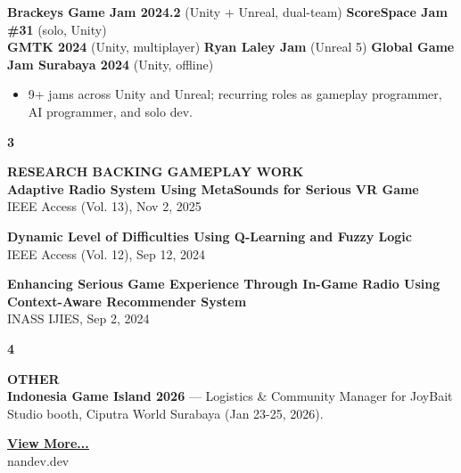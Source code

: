 \documentclass[11pt,a4paper]{article}
\begin{document}
\begin{minipage}[t]{18cm}
\begin{minipage}[t]{17cm}
\textbf{Brackeys Game Jam 2024.2} (Unity + Unreal, dual-team) \textbar{} \textbf{ScoreSpace Jam \#31} (solo, Unity)\\
\textbf{GMTK 2024} (Unity, multiplayer) \textbar{} \textbf{Ryan Laley Jam} (Unreal 5) \textbar{} \textbf{Global Game Jam Surabaya 2024} (Unity, offline)
\begin{itemize}[leftmargin=*, nosep, itemsep=2pt, topsep=2pt]
    \item 9+ jams across Unity and Unreal; recurring roles as gameplay programmer, AI programmer, and solo dev.
\end{itemize}

\end{minipage}

\vspace{0.5cm}

\begin{minipage}[t]{0.8cm}
{\Large\bfseries 3}
\end{minipage}%
\begin{minipage}[t]{17cm}
{\large\bfseries RESEARCH BACKING GAMEPLAY WORK}\\[8pt]

\textbf{Adaptive Radio System Using MetaSounds for Serious VR Game}\\
{\small IEEE Access (Vol. 13), Nov 2, 2025}

\vspace{0.2cm}

\textbf{Dynamic Level of Difficulties Using Q-Learning and Fuzzy Logic}\\
{\small IEEE Access (Vol. 12), Sep 12, 2024}

\vspace{0.2cm}

\textbf{Enhancing Serious Game Experience Through In-Game Radio Using Context-Aware Recommender System}\\
{\small INASS IJIES, Sep 2, 2024}

\end{minipage}

\vspace{0.5cm}

\begin{minipage}[t]{0.8cm}
{\Large\bfseries 4}
\end{minipage}%
\begin{minipage}[t]{17cm}
{\large\bfseries OTHER}\\[8pt]

\textbf{Indonesia Game Island 2026} — Logistics \& Community Manager for JoyBait Studio booth, Ciputra World Surabaya (Jan 23-25, 2026).

\end{minipage}

\vspace{0.8cm}

\begin{center}
\href{https://nandev.dev}{\bfseries\color{accent}\underline{View More...}}\\[4pt]
{\small nandev.dev}
\end{center}

\end{minipage}
\end{document}
